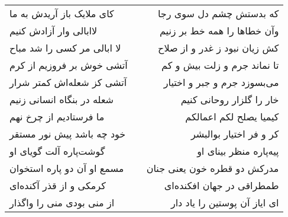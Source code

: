 \begin{center}
\begin{longtable}{l p{0.5cm} r}
\\
کای ملایک باز آریدش به ما
&&
که بدستش چشم دل سوی رجا
\\
لاابالی وار آزادش کنیم
&&
وآن خطاها را همه خط بر زنیم
\\
لا ابالی مر کسی را شد مباح
&&
کش زیان نبود ز غدر و از صلاح
\\
آتشی خوش بر فروزیم از کرم
&&
تا نماند جرم و زلت بیش و کم
\\
آتشی کز شعله‌اش کمتر شرار
&&
می‌بسوزد جرم و جبر و اختیار
\\
شعله در بنگاه انسانی زنیم
&&
خار را گلزار روحانی کنیم
\\
ما فرستادیم از چرخ نهم
&&
کیمیا یصلح لکم اعمالکم
\\
خود چه باشد پیش نور مستقر
&&
کر و فر اختیار بوالبشر
\\
گوشت‌پاره آلت گویای او
&&
پیه‌پاره منظر بینای او
\\
مسمع او آن دو پاره استخوان
&&
مدرکش دو قطره خون یعنی جنان
\\
کرمکی و از قذر آکنده‌ای
&&
طمطراقی در جهان افکنده‌ای
\\
از منی بودی منی را واگذار
&&
ای ایاز آن پوستین را یاد دار
\\
\end{longtable}
\end{center}
